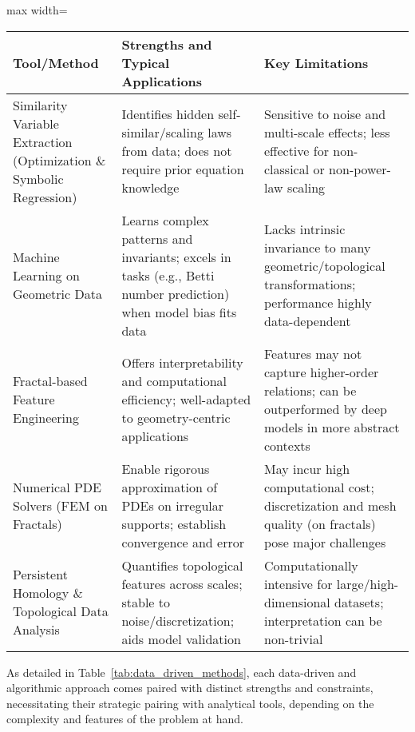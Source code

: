 \documentclass[sigconf]{acmart}
\begin{document}
\begin{table*}[htbp]
\centering
\caption{Comparative Summary of Data-driven and Algorithmic Approaches}
\label{tab:data_driven_methods}
\begin{adjustbox}{max width=\textwidth}
\begin{tabular}{lll}
\toprule
\textbf{Tool/Method} & \textbf{Strengths and Typical Applications} & \textbf{Key Limitations} \\
\midrule
Similarity Variable Extraction (Optimization \& Symbolic Regression) & Identifies hidden self-similar/scaling laws from data; does not require prior equation knowledge & Sensitive to noise and multi-scale effects; less effective for non-classical or non-power-law scaling \\
Machine Learning on Geometric Data & Learns complex patterns and invariants; excels in tasks (e.g., Betti number prediction) when model bias fits data & Lacks intrinsic invariance to many geometric/topological transformations; performance highly data-dependent \\
Fractal-based Feature Engineering & Offers interpretability and computational efficiency; well-adapted to geometry-centric applications & Features may not capture higher-order relations; can be outperformed by deep models in more abstract contexts \\
Numerical PDE Solvers (FEM on Fractals) & Enable rigorous approximation of PDEs on irregular supports; establish convergence and error & May incur high computational cost; discretization and mesh quality (on fractals) pose major challenges \\
Persistent Homology \& Topological Data Analysis & Quantifies topological features across scales; stable to noise/discretization; aids model validation & Computationally intensive for large/high-dimensional datasets; interpretation can be non-trivial \\
\bottomrule
\end{tabular}
\end{adjustbox}
\end{table*}

As detailed in Table~\ref{tab:data_driven_methods}, each data-driven and algorithmic approach comes paired with distinct strengths and constraints, necessitating their strategic pairing with analytical tools, depending on the complexity and features of the problem at hand.
\end{document}
